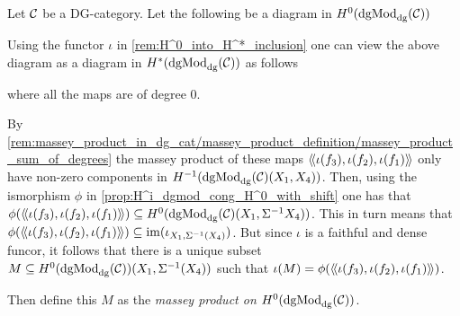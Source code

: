 \begin{definition}
    \label{def:massey_product_H^0(dgMod_dg(C))}
    Let \( {\mathcal{C}} \) be a DG-category. Let the following be a diagram in \( H^0(\operatorname{dgMod}_{\operatorname{dg}}({\mathcal{C}})) \)
    \begin{center}
    \end{center}
    Using the functor \( \iota \) in \autoref{rem:H^0_into_H^*_inclusion} one can view the above diagram as a diagram in \( H^*(\operatorname{dgMod}_{\operatorname{dg}}({\mathcal{C}})) \) as follows
    \begin{center}
    \end{center}
    where all the maps are of degree \( 0 \).

    By \autoref{rem:massey_product_in_dg_cat/massey_product_definition/massey_product_sum_of_degrees} the massey product of these maps \( \langle \! \langle \iota(f_3), \iota(f_2), \iota(f_1) \rangle \! \rangle \) only have non-zero components in \( H^{-1}(\operatorname{dgMod}_{\operatorname{dg}}({\mathcal{C}})(X_1, X_4)) \). Then, using the ismorphism \( \phi \) in \autoref{prop:H^i_dgmod_cong_H^0_with_shift} one has that \( \phi(\langle \! \langle \iota(f_3), \iota(f_2), \iota(f_1) \rangle \! \rangle) \subseteq H^0(\operatorname{dgMod}_{\operatorname{dg}}({\mathcal{C}})(X_1, \Sigma^{-1}X_4)) \). This in turn means that \( \phi(\langle \! \langle \iota(f_3), \iota(f_2), \iota(f_1) \rangle \! \rangle) \subseteq \operatorname{im}(\iota_{X_1, \Sigma^{-1}(X_4)}) \). But since \( \iota \) is a faithful and dense funcor, it follows that there is a unique subset \( M \subseteq H^0(\operatorname{dgMod}_{\operatorname{dg}}({\mathcal{C}}))(X_1, \Sigma^{-1}(X_4)) \) such that \( \iota(M) = \phi(\langle \! \langle \iota(f_3), \iota(f_2), \iota(f_1) \rangle \! \rangle) \).

    Then define this \( M \) as the \emph{massey product on \( H^0(\operatorname{dgMod}_{\operatorname{dg}}({\mathcal{C}})) \)}.
\end{definition}

